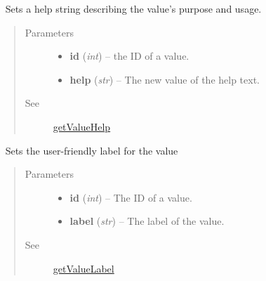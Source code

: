 \documentclass[letterpaper,10pt,english]{sphinxmanual}
\begin{document}
\begin{fulllineitems}
\begin{fulllineitems}
\end{fulllineitems}


\begin{fulllineitems}
\label{libopenzwave:libopenzwave.PyManager.setValueHelp}~\label{libopenzwave:setvaluehelp}
Sets a help string describing the value's purpose and usage.
\begin{quote}\begin{description}
\item[{Parameters}] \leavevmode\begin{itemize}
\item {} 
\textbf{id} (\emph{int}) -- the ID of a value.

\item {} 
\textbf{help} (\emph{str}) -- The new value of the help text.

\end{itemize}

\item[{See}] \leavevmode
{\hyperref[libopenzwave:getvaluehelp]{getValueHelp}}

\end{description}\end{quote}

\end{fulllineitems}


\begin{fulllineitems}
\label{libopenzwave:libopenzwave.PyManager.setValueLabel}~\label{libopenzwave:setvaluelabel}
Sets the user-friendly label for the value
\begin{quote}\begin{description}
\item[{Parameters}] \leavevmode\begin{itemize}
\item {} 
\textbf{id} (\emph{int}) -- The ID of a value.

\item {} 
\textbf{label} (\emph{str}) -- The label of the value.

\end{itemize}

\item[{See}] \leavevmode
{\hyperref[libopenzwave:getvaluelabel]{getValueLabel}}


\end{description}
\end{quote}
\end{fulllineitems}
\end{fulllineitems}
\end{document}

